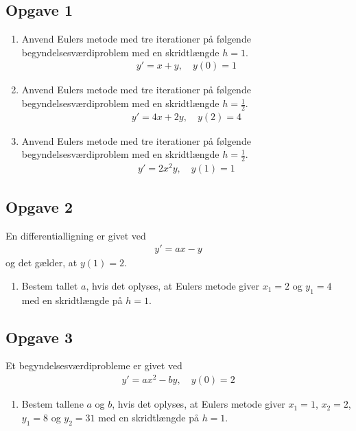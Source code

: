 \subsection*{Opgave 1}
\begin{enumerate}[label=\roman*)]
	\item Anvend Eulers metode med tre iterationer på følgende begyndelsesværdiproblem med en skridtlængde $h = 1$. 
	\begin{align*}
		y' = x + y, \quad y(0) = 1
	\end{align*}
	\item Anvend Eulers metode med tre iterationer på følgende begyndelsesværdiproblem med en skridtlængde $h = \frac{1}{2}$. 
	\begin{align*}
		y' = 4x + 2y, \quad y(2) = 4
	\end{align*}
	\item Anvend Eulers metode med tre iterationer på følgende begyndelsesværdiproblem med en skridtlængde $h = \frac{1}{2}$. 
	\begin{align*}
		y' = 2x^2y, \quad y(1) = 1
	\end{align*}
\end{enumerate}

\subsection*{Opgave 2}
En differentialligning er givet ved
\begin{align*}
	y' = ax - y
\end{align*}
og det gælder, at $y(1) = 2$. 
\begin{enumerate}[label=\roman*)]
	\item Bestem tallet $a$, hvis det oplyses, at Eulers metode giver $x_1 = 2$ og $y_1 = 4$ med en skridtlængde på $h = 1$.  
\end{enumerate}
\subsection*{Opgave 3}
Et begyndelsesværdiprobleme er givet ved
\begin{align*}
	y' = ax^2 - by, \quad y(0) = 2
\end{align*}
\begin{enumerate}[label=\roman*)]
	\item Bestem tallene $a$ og $b$, hvis det oplyses, at Eulers metode giver $x_1 = 1$, $x_2 = 2$, $y_1 = 8$ og $y_2 = 31$ med en skridtlængde på $h = 1$. 
\end{enumerate}

